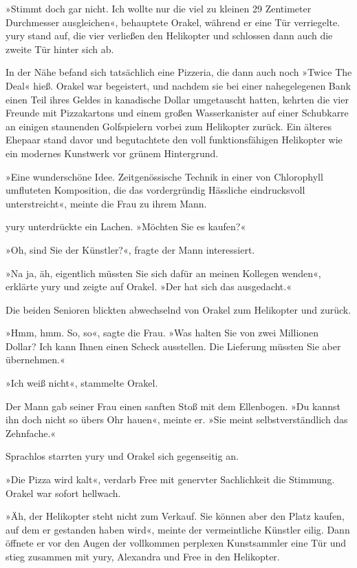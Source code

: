 »Stimmt doch gar nicht. Ich wollte nur die viel zu kleinen 29 Zentimeter Durchmesser ausgleichen«, behauptete Orakel, während er eine Tür verriegelte. yury stand auf, die vier verließen den Helikopter und schlossen dann auch die zweite Tür hinter sich ab.

In der Nähe befand sich tatsächlich eine Pizzeria, die dann auch noch »Twice The Deal« hieß. Orakel war begeistert, und nachdem sie bei einer nahegelegenen Bank einen Teil ihres Geldes in kanadische Dollar umgetauscht hatten, kehrten die vier Freunde mit Pizzakartons und einem großen Wasserkanister auf einer Schubkarre an einigen staunenden Golfspielern vorbei zum Helikopter zurück. Ein älteres Ehepaar stand davor und begutachtete den voll funktionsfähigen Helikopter wie ein modernes Kunstwerk vor grünem Hintergrund.

»Eine wunderschöne Idee. Zeitgenössische Technik in einer von Chlorophyll umfluteten Komposition, die das vordergründig Hässliche eindrucksvoll unterstreicht«, meinte die Frau zu ihrem Mann.

yury unterdrückte ein Lachen. »Möchten Sie es kaufen?«

»Oh, sind Sie der Künstler?«, fragte der Mann interessiert.

»Na ja, äh, eigentlich müssten Sie sich dafür an meinen Kollegen wenden«, erklärte yury und zeigte auf Orakel. »Der hat sich das ausgedacht.«

Die beiden Senioren blickten abwechselnd von Orakel zum Helikopter und zurück.

»Hmm, hmm. So, so«, sagte die Frau. »Was halten Sie von zwei Millionen Dollar? Ich kann Ihnen einen Scheck ausstellen. Die Lieferung müssten Sie aber übernehmen.«

»Ich weiß nicht«, stammelte Orakel.

Der Mann gab seiner Frau einen sanften Stoß mit dem Ellenbogen. »Du kannst ihn doch nicht so übers Ohr hauen«, meinte er. »Sie meint selbstverständlich das Zehnfache.«

Sprachlos starrten yury und Orakel sich gegenseitig an.

»Die Pizza wird kalt«, verdarb Free mit genervter Sachlichkeit die Stimmung. Orakel war sofort hellwach.

»Äh, der Helikopter steht nicht zum Verkauf. Sie können aber den Platz kaufen, auf dem er gestanden haben wird«, meinte der vermeintliche Künstler eilig. Dann öffnete er vor den Augen der vollkommen perplexen Kunstsammler eine Tür und stieg zusammen mit yury, Alexandra und Free in den Helikopter.

